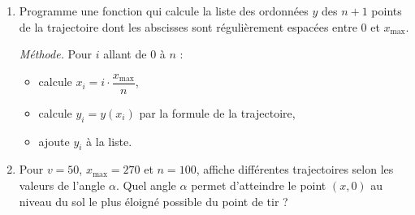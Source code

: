 \documentclass[11pt,class=report,crop=false]{standalone}
\begin{document}
\begin{activite}
\begin{enumerate}
  \item Programme une fonction  qui calcule la liste des ordonnées $y$ des $n+1$ points de la trajectoire dont les abscisses sont régulièrement espacées entre $0$ et $x_{\max}$. 
  
  \emph{Méthode.} Pour $i$ allant de $0$ à $n$ :
  \begin{itemize}
    \item calcule $x_i = i \cdot \dfrac{x_{\max}}{n}$,    
    \item calcule $y_i = y(x_i)$ par la formule de la trajectoire,
    \item ajoute $y_i$ à la liste.
  \end{itemize}  
  
  
  \item Pour $v=50$, $x_{\max} = 270$ et $n=100$, affiche différentes trajectoires selon les valeurs de l'angle $\alpha$. Quel angle $\alpha$ permet d'atteindre le point $(x,0)$ au niveau du sol le plus éloigné possible du point de tir ?
  
  
\end{enumerate}

\end{activite}
\end{document}
